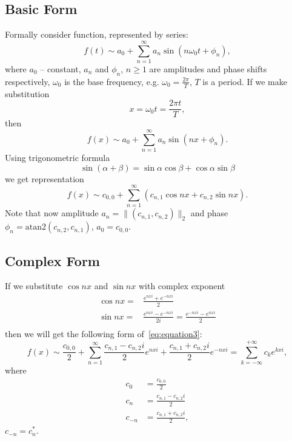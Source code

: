 \subsection{Basic Form}\label{subsec:basic-form}

    Formally consider function, represented by series:
    \begin{equation}\label{eq:equation}
        f(t) \sim a_0 + \sum_{n=1}^{\infty} a_n \sin (n \omega_0 t + \phi_n),
    \end{equation}
    where $a_0$ -- constant, $a_n$ and $\phi_n$, $n \geq 1$ are amplitudes and phase shifts respectively,
    $\omega_0$ is the base frequency, e.g. $\omega_0 = \frac{2\pi}{T}$, $T$  is a period.
    If we make substitution
    \[
        x = \omega_0 t  = \frac{2\pi t}{T},
    \]
    then
    \begin{equation}\label{eq:equation2}
        f(x) \sim a_0 + \sum_{n=1}^{\infty} a_n \sin (n x + \phi_n).
    \end{equation}
    Using trigonometric formula
    \[
        \sin (\alpha +  \beta)  = \sin \alpha \cos \beta + \cos \alpha \sin \beta
    \]
    we get representation
    \begin{equation}\label{eq:equation3}
        f(x) \sim c_{0, 0} + \sum_{n=1}^{\infty} \left( c_{n, 1} \cos nx + c_{n, 2} \sin nx \right).
    \end{equation}
    Note that now amplitude $a_n = \|(c_{n, 1}, c_{n, 2})\|_2$ and phase $\phi_n = \mathrm{atan2} (c_{n, 2}, c_{n, 1})$,
    $a_0 = c_{0, 0}$.

\subsection{Complex Form}\label{subsec:complex-form}

    If we substitute $\cos nx$ and $\sin nx$ with complex exponent
    \begin{align*}
        \cos nx = & \frac{e^{nxi} + e^{-nxi}}{2}   \\
        \sin nx = & \frac{e^{nxi} - e^{-nxi}}{2i} = \frac{e^{-nxi} - e^{nxi}}{2} \\
    \end{align*}
    then we will get the following form of~\ref{eq:equation3}:
    \begin{equation}\label{eq:equation4}
        f(x) \sim \frac{c_{0,0}}{2} + \sum_{n=1}^{\infty} \frac{c_{n, 1} - c_{n, 2}i}{2} e^{nxi} +
        \frac{c_{n, 1} + c_{n, 2}i}{2} e^{-nxi} = \allowbreak  \sum_{k=-\infty}^{+\infty} c_k e^{kxi},
    \end{equation}
    where
    \begin{align}
        c_0 & = \frac{c_{0, 0}}{2} \\
        c_n &= \frac{c_{n,1} - c_{n,2}i}{2} \\
        c_{-n} &= \frac{c_{n,1} + c_{n,2}i}{2},
    \end{align}
    $c_{-n} = c_n^{\ast}$.


